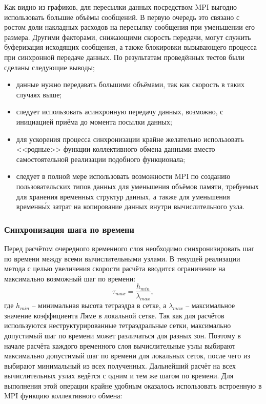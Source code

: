 Как видно из графиков, для пересылки данных посредством MPI выгодно использовать большие объёмы сообщений. В первую очередь это связано с ростом доли накладных расходов на пересылку сообщения при уменьшении его размера. Другими факторами, снижающими скорость передачи, могут служить буферизация исходящих сообщения, а также блокировки вызывающего процесса при синхронной передаче данных. По результатам проведённых тестов были сделаны следующие выводы;
\begin{itemize}
	\item данные нужно передавать большими объёмами, так как скорость в таких случаях выше;
	\item следует использовать асинхронную передачу данных, возможно, с инициацией приёма до момента посылки данных;
	\item для ускорения процесса синхронизации крайне желательно использовать <<родные>> функции коллективного обмена данными вместо самостоятельной реализации подобного функционала;
	\item следует в полной мере использовать возможности MPI по созданию пользовательских типов данных для уменьшения объёмов памяти, требуемых для хранения временных структур данных, а также для уменьшения временн\'{ы}х затрат на копирование данных внутри вычислительного узла.
\end{itemize}

\subsubsection{Синхронизация шага по времени}
Перед расчётом очередного временного слоя необходимо синхронизировать шаг по времени между всеми вычислительными узлами. В текущей реализации метода с целью увеличения скорости расчёта вводится ограничение на максимально возможный шаг по времени:
\begin{equation}
\label{max_time_step}
\tau_{max}=\frac{h_{min}}{\lambda_{max}},
\end{equation}
где $h_{min}$ -- минимальная высота тетраэдра в сетке, а $\lambda_{max}$ -- максимальное значение коэффициента Ляме в локальной сетке. Так как для расчётов используются неструктурированные тетраэдральные сетки, максимально допустимый шаг по времени может различаться для разных зон. Поэтому в начале расчёта каждого временного слоя вычислительные узлы выбирают максимально допустимый шаг по времени для локальных сеток, после чего из выбирают минимальный из всех полученных. Дальнейший расчёт на всех вычислительных узлах ведётся с одним и тем же шагом по времени. Для выполнения этой операции крайне удобным оказалось использовать встроенную в MPI функцию коллективного обмена:
